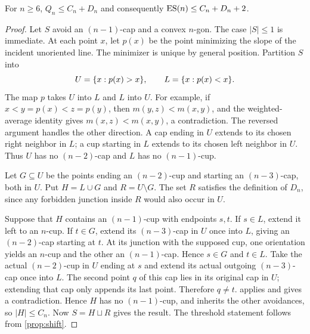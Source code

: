 \begin{theorem}\label{thm:transfer}
For $n\ge6$, $Q_n\le C_n+D_n$ and consequently
$\operatorname{ES}(n)\le C_n+D_n+2$.
\end{theorem}
\begin{proof}
Let $S$ avoid an $(n-1)$-cap and a convex $n$-gon. The case $|S|\le1$
is immediate. At each point $x$, let $p(x)$ be the point minimizing
the slope of the incident unoriented line. The minimizer is unique
by general position. Partition $S$ into
\[
 U=\{x:p(x)>x\},\qquad L=\{x:p(x)<x\}.
\]
The map $p$ takes $U$ into $L$ and $L$ into $U$. For example, if
$x<y=p(x)<z=p(y)$, then $m(y,z)<m(x,y)$, and the weighted-average
identity gives $m(x,z)<m(x,y)$, a contradiction. The reversed argument
handles the other direction. A cap ending in $U$ extends to its chosen
right neighbor in $L$; a cup starting in $L$ extends to its chosen
left neighbor in $U$. Thus $U$ has no $(n-2)$-cap and $L$ has no
$(n-1)$-cup.

Let $G\subseteq U$ be the points ending an $(n-2)$-cup and starting
an $(n-3)$-cap, both in $U$. Put $H=L\cup G$ and $R=U\setminus G$.
The set $R$ satisfies the definition of $D_n$, since any forbidden
junction inside $R$ would also occur in $U$.

Suppose that $H$ contains an $(n-1)$-cup with endpoints $s,t$. If
$s\in L$, extend it left to an $n$-cup. If $t\in G$, extend its
$(n-3)$-cap in $U$ once into $L$, giving an $(n-2)$-cap starting at
$t$. At its junction with the supposed cup, one orientation yields
an $n$-cup and the other an $(n-1)$-cap. Hence $s\in G$ and $t\in L$.
Take the actual $(n-2)$-cup in $U$ ending at $s$ and extend its actual
outgoing $(n-3)$-cap once into $L$. The second point $q$ of this cap
lies in its original cap in $U$; extending that cap only appends its
last point. Therefore $q\ne t$.
 applies and gives a contradiction. Hence $H$
has no $(n-1)$-cup, and inherits the other avoidances, so $|H|\le C_n$.
Now $S=H\sqcup R$ gives the result. The threshold statement follows
from \cref{prop:shift}.
\end{proof}
